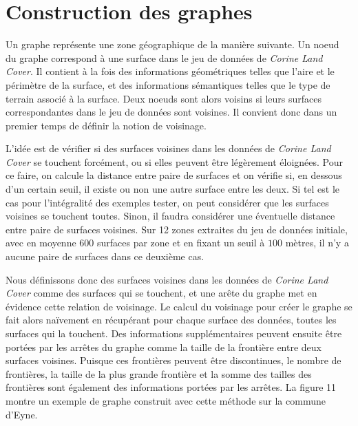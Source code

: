\section{Construction des graphes}







Un graphe représente une zone géographique de la manière suivante.
Un noeud du graphe correspond à une surface dans le jeu de données de \emph{Corine Land Cover}.
Il contient à la fois des informations géométriques telles que l'aire et le périmètre de la surface, et des informations sémantiques telles que le type de terrain associé à la surface.
Deux noeuds sont alors voisins si leurs surfaces correspondantes dans le jeu de données sont voisines.
Il convient donc dans un premier temps de définir la notion de voisinage. %

L'idée est de vérifier si des surfaces voisines dans les données de \emph{Corine Land Cover} se touchent forcément, ou si elles peuvent être légèrement éloignées.
Pour ce faire, on calcule la distance entre paire de surfaces et on vérifie si, en dessous d'un certain seuil, il existe ou non une autre surface entre les deux.
Si tel est le cas pour l'intégralité des exemples tester, on peut considérer que les surfaces voisines se touchent toutes.
Sinon, il faudra considérer une éventuelle distance entre paire de surfaces voisines.
Sur 12 zones extraites du jeu de données initiale, avec en moyenne 600 surfaces par zone et en fixant un seuil à $100$ mètres, il n'y a aucune paire de surfaces dans ce deuxième cas.

Nous définissons donc des surfaces voisines dans les données de \emph{Corine Land Cover} comme des surfaces qui se touchent, et une arête du graphe met en évidence cette relation de voisinage.
Le calcul du voisinage pour créer le graphe se fait alors naïvement en récupérant pour chaque surface des données, toutes les surfaces qui la touchent.
Des informations supplémentaires peuvent ensuite être portées par les arrêtes du graphe comme la taille de la frontière entre deux surfaces voisines.
Puisque ces frontières peuvent être discontinues, le nombre de frontières, la taille de la plus grande frontière et la somme des tailles des frontières sont également des informations portées par les arrêtes.
La figure 11 montre un exemple de graphe construit avec cette méthode sur la commune d'Eyne.


